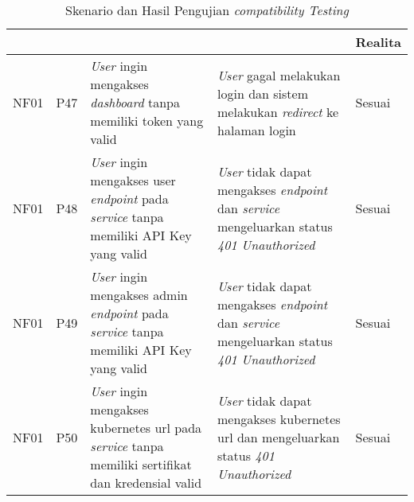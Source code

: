 \bgroup
\begin{table}[ht]
  \def\arraystretch{1.3}
  \caption{Skenario dan Hasil Pengujian \textit{compatibility Testing}}
  \label{tab:pengujian-nonfungsional-compatibility}
  \centering
  \begin{tabular}{|p{2cm}|p{2cm}|p{3cm}|p{3cm}|p{1.5cm}|}
    \hline
    \centering{ID Fungsional} & \centering{ID Pengujian} & \centering{Skenario}                                                                                              & \centering{Ekspektasi}                                                                                                   & Realita \\
    \hline
    NF01                      & P47                      & \textit{User} ingin mengakses \textit{dashboard} tanpa memiliki token yang valid                                  & \textit{User} gagal melakukan login dan sistem melakukan \textit{redirect} ke halaman login                              & Sesuai  \\
    \hline
    NF01                      & P48                      & \textit{User} ingin mengakses user \textit{endpoint} pada \textit{service} tanpa memiliki API Key yang valid      & \textit{User} tidak dapat mengakses \textit{endpoint} dan \textit{service} mengeluarkan status \textit{401 Unauthorized} & Sesuai  \\
    \hline
    NF01                      & P49                      & \textit{User} ingin mengakses admin \textit{endpoint} pada \textit{service} tanpa memiliki API Key yang valid     & \textit{User} tidak dapat mengakses \textit{endpoint} dan \textit{service} mengeluarkan status \textit{401 Unauthorized} & Sesuai  \\
    \hline
    NF01                      & P50                      & \textit{User} ingin mengakses kubernetes url pada \textit{service} tanpa memiliki sertifikat dan kredensial valid & \textit{User} tidak dapat mengakses kubernetes url dan mengeluarkan status \textit{401 Unauthorized}                     & Sesuai  \\
    \hline
  \end{tabular}
\end{table}
\egroup